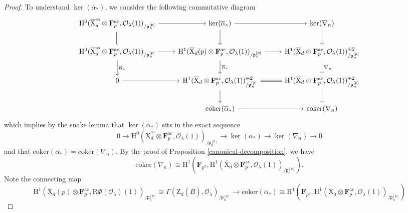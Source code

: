 \documentclass[10pt]{amsart}
\numberwithin{equation}{section}
\theoremstyle{plain}
\numberwithin{equation}{section}
\theoremstyle{definition}
\theoremstyle{remark}
\def\coker{\mathrm{coker}}
\def\ac{\mathrm{ac}}
\def\ss{\mathrm{ss}}
\def\ac{\mathrm{ac}}
\def\calO{\mathcal{O}}
\def\frakp{\mathfrak{p}}
\def\FF{\mathbf{F}}
\def\rmH{\mathrm{H}}
\def\rmX{\mathrm{X}}
\def\rmR{\mathrm{R}}
\def\rmZ{\mathrm{Z}}
\begin{document}
\begin{proof}
To understand $\ker(\overline{\alpha}_{\ast})$, we consider the following commutative diagram
\begin{equation}\label{dia2}
\begin{tikzcd}
\rmH^{0}(\overline{\rmX}^{\ss}_{d}\otimes{\FF^{\ac}_{p}}, \calO_{\lambda}(1))_{/\frakp^{[p]}_{n}}\arrow[r] \arrow[d, Rightarrow, no head] & \ker(\overline{\alpha}_{\ast}) \arrow[d] \arrow[r] & \ker(\nabla_{n}) \arrow[d] \\
\rmH^{0}(\overline{\rmX}^{\ss}_{d}\otimes{\FF^{\ac}_{p}}, \calO_{\lambda}(1))_{/\frakp^{[p]}_{n}} \arrow[r] \arrow[d, "\overline{\alpha}_{\ast}"] & \rmH^{1}(\overline{\rmX}_{d}(p)\otimes{\FF^{\ac}_{p}}, \calO_{\lambda}(1))_{/\frakp^{[p]}_{n}} \arrow[r] \arrow[d, "\overline{\alpha}_{\ast}"] & \rmH^{1}(\overline{\rmX}_{d}\otimes{\FF^{\ac}_{p}}, \calO_{\lambda}(1))^{\oplus 2}_{/\frakp^{[p]}_{n}} \arrow[d, "\nabla_{n}"] \\
0 \arrow[r]  & \rmH^{1}(\overline{\rmX}_{d}\otimes{\FF^{\ac}_{p}}, \calO_{\lambda}(1))^{\oplus 2}_{/\frakp^{[p]}_{n}} \arrow[r, Rightarrow, no head] \arrow[d] & \rmH^{1}(\overline{\rmX}_{d}\otimes{\FF^{\ac}_{p}}, \calO_{\lambda}(1))^{\oplus2}_{/\frakp^{[p]}_{n}} \arrow[d] \\
          & \coker(\overline{\alpha}_{\ast}) \arrow[r]           & \coker(\nabla_{n})     
\end{tikzcd}
\end{equation}
which implies by the snake lemma that $\ker(\overline{\alpha}_{\ast})$ sits in the exact sequence
\begin{equation}\label{ker-alpha}
0\rightarrow \rmH^{0}(\overline{\rmX}^{\ss}_{d}\otimes{\FF^{\ac}_{p}}, \calO_{\lambda}(1))_{/\frakp^{[p]}_{n}}\rightarrow \ker(\overline{\alpha}_{\ast})\rightarrow \ker(\nabla_{n})\rightarrow0
\end{equation}
and that $\coker(\overline{\alpha}_{\ast})=\coker(\nabla_{n})$. By the proof of Proposition \ref{canonical-decomposition}, we have 
\begin{equation*}
\coker(\nabla_{n})\cong\rmH^{1}(\FF_{p^{2}}, \rmH^{1}(\overline{\rmX}_{d}\otimes{\FF^{\ac}_{p}}, \calO_{\lambda}(1))_{/\frakp^{[p]}_{n}}). 
\end{equation*}
Note the connecting map  
\begin{equation*}
\rmH^{1}(\overline{\rmX}_{d}(p)\otimes{\FF^{\ac}_{p}}, \rmR\Phi(\calO_{\lambda})(1))_{/\frakp^{[p]}_{n}}\cong \Gamma(\rmZ_{d}(\overline{B}), \calO_{\lambda})_{/\frakp^{[p]}_{n}}\rightarrow \coker(\overline{\alpha}_{\ast})\cong \rmH^{1}(\FF_{p^{2}}, \rmH^{1}(\overline{\rmX}_{d}\otimes{\FF^{\ac}_{p}}, \calO_{\lambda}(1))_{/\frakp^{[p]}_{n}})

\end{equation*}
\end{proof}
\end{document}
